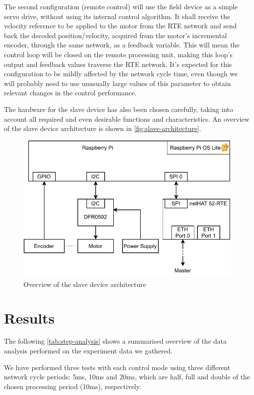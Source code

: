 \documentclass[a4paper]{IEEEtran}
\begin{document}
The second configuration (remote control) will use the field device as a simple servo drive, without using its internal control algorithm.
It shall receive the velocity reference to be applied to the motor from the RTE network and send back the decoded position/velocity, acquired from the motor's incremental encoder, through the same network, as a feedback variable.
This will mean the control loop will be closed on the remote processing unit, making this loop's output and feedback values traverse the RTE network.
It's expected for this configuration to be mildly affected by the network cycle time, even though we will probably need to use unusually large values of this parameter to obtain relevant changes in the control performance.

The hardware for the slave device has also been chosen carefully, taking into account all required and even desirable functions and characteristics.
An overview of the slave device architecture is shown in \autoref{fig:slave-architecture}.

\begin{figure}[ht]
  \centering
  \includegraphics[width=.8\linewidth]{slave_architecture.pdf}
  \caption{Overview of the slave device architecture}
  \label{fig:slave-architecture}
\end{figure}

\section{Results}
The following \autoref{tab:step-analysis} shows a summarised overview of the data analysis performed on the experiment data we gathered.

We have performed three tests with each control mode using three different network cycle periods: 5ms, 10ms and 20ms, which are half, full and double of the chosen processing period (10ms), respectively.
\end{document}
